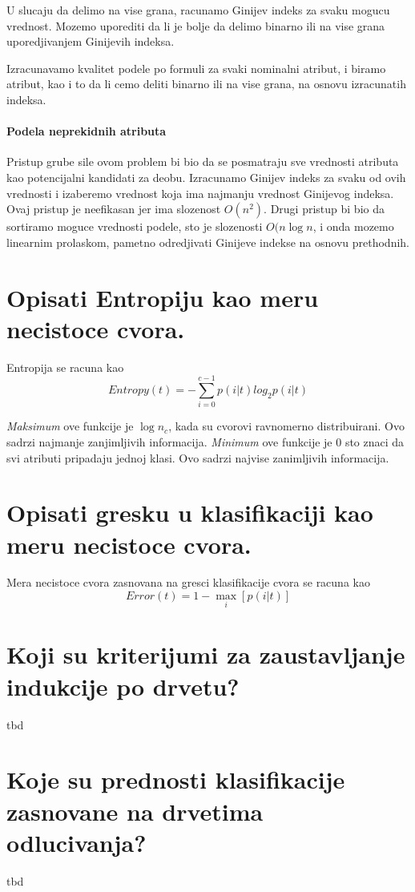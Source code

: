\documentclass[a4paper]{article}
\begin{document}
U slucaju da delimo na vise grana, racunamo Ginijev indeks za svaku mogucu vrednost. Mozemo
uporediti da li je bolje da delimo binarno ili na vise grana uporedjivanjem Ginijevih indeksa.

Izracunavamo kvalitet podele po formuli za svaki nominalni atribut, i biramo atribut, kao i to da li
cemo deliti binarno ili na vise grana, na osnovu izracunatih indeksa.

\paragraph{Podela neprekidnih atributa} Pristup grube sile ovom problem bi bio da se posmatraju sve
vrednosti atributa kao potencijalni kandidati za deobu. Izracunamo Ginijev indeks za svaku od ovih
vrednosti i izaberemo vrednost koja ima najmanju vrednost Ginijevog indeksa. Ovaj pristup je
neefikasan jer ima slozenost \(O(n^2)\). Drugi pristup bi bio da sortiramo moguce vrednosti podele,
sto je slozenosti \(O(n\log n\), i onda mozemo linearnim prolaskom, pametno odredjivati Ginijeve
indekse na osnovu prethodnih.

\section{Opisati Entropiju kao meru necistoce cvora.}
Entropija se racuna kao
\[
    Entropy(t) = - \sum_{i=0}^{c-1} p(i|t)log_2 p(i|t)
\]

\emph{Maksimum} ove funkcije je \(\log n_c\), kada su cvorovi ravnomerno distribuirani. Ovo sadrzi
najmanje zanjimljivih informacija. \emph{Minimum} ove funkcije je \(0\) sto znaci da svi atributi
pripadaju jednoj klasi. Ovo sadrzi najvise zanimljivih informacija.

\section{Opisati gresku u klasifikaciji kao meru necistoce cvora.}
Mera necistoce cvora zasnovana na gresci klasifikacije cvora se racuna kao
\[
    Error(t) = 1 - \max_i[p(i|t)]
\]

\section{Koji su kriterijumi za zaustavljanje indukcije po drvetu?}
tbd
\section{Koje su prednosti klasifikacije zasnovane na drvetima odlucivanja?}
tbd
\end{document}
